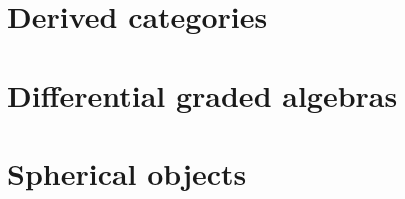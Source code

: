 \documentclass[a4paper, 10pt, oneside, DIV=9, chapterprefix=true, numbers=enddot,bibliography=totoc]{scrbook}
\begin{document}

\chapter{Derived categories}

	
	
	
%	


\chapter{Differential graded algebras}
	
	
	
	
	
	
%	


\chapter{Spherical objects}

%	
	
	
	
	
	




\nocite{*}


\backmatter{}
\printbibliography[heading=bibintoc, title={References}]
\end{document}
